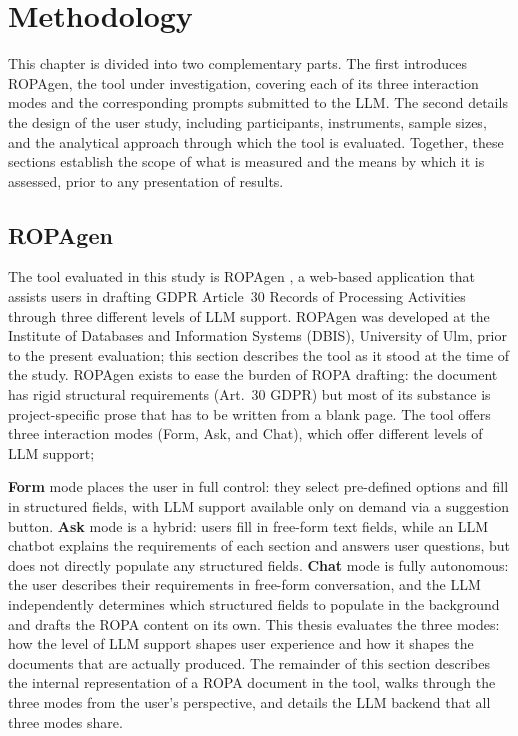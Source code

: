 \chapter{Methodology}
\label{ch:methodology}

This chapter is divided into two complementary parts. The first introduces ROPAgen, the tool under investigation, covering each of its three interaction modes and the corresponding prompts submitted to the LLM. The second details the design of the user study, including participants, instruments, sample sizes, and the analytical approach through which the tool is evaluated. Together, these sections establish the scope of what is measured and the means by which it is assessed, prior to any presentation of results.

\section{ROPAgen}
\label{sec:ropagen}

The tool evaluated in this study is ROPAgen \cite{KastratovicRopagen}, a web-based application that assists users in drafting GDPR Article~30 Records of Processing Activities through three different levels of LLM support.
ROPAgen was developed at the Institute of Databases and Information Systems (DBIS), University of Ulm, prior to the present evaluation; this section describes the tool as it stood at the time of the study.
ROPAgen exists to ease the burden of ROPA drafting: the document has rigid structural requirements (Art.~30 GDPR) but most of its substance is project-specific prose that has to be written from a blank page.
The tool offers three interaction modes (Form, Ask, and Chat), which offer different levels of LLM support;

\textbf{Form} mode places the user in full control: they select pre-defined options and fill in structured fields, with LLM support available only on demand via a suggestion button.
\textbf{Ask} mode is a hybrid: users fill in free-form text fields, while an LLM chatbot explains the requirements of each section and answers user questions, but does not directly populate any structured fields.
\textbf{Chat} mode is fully autonomous: the user describes their requirements in free-form conversation, and the LLM independently determines which structured fields to populate in the background and drafts the ROPA content on its own.
This thesis evaluates the three modes: how the level of LLM support shapes user experience and how it shapes the documents that are actually produced.
The remainder of this section describes the internal representation of a ROPA document in the tool, walks through the three modes from the user's perspective, and details the LLM backend that all three modes share.

